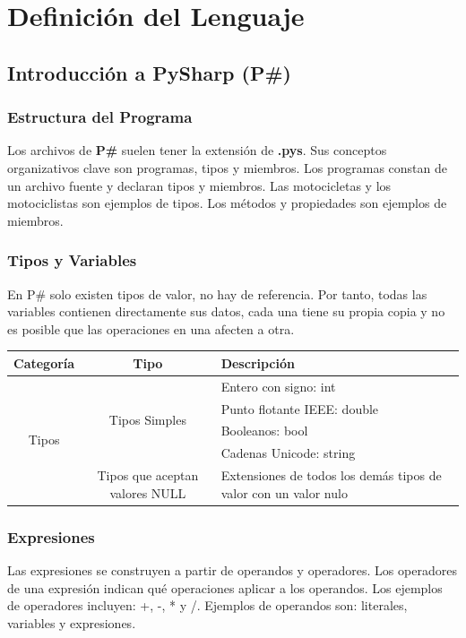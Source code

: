 \documentclass[12pt, letterpaper,spanish]{article}
\theoremstyle{definition}
\theoremstyle{remark}
\begin{document}
\newpage

\section{Definición del Lenguaje {\footnotesize \cite{conferenciasC}\cite{ullman}}}
	\subsection{Introducción a PySharp (P\#)}

		\subsubsection{Estructura del Programa}
		Los archivos de \textbf{P\#} suelen tener la extensión de \textbf{.pys}. Sus conceptos organizativos clave son programas, tipos y miembros. Los programas constan de un archivo fuente y declaran tipos y miembros. Las motocicletas y los motociclistas son ejemplos de tipos. Los métodos y propiedades son ejemplos de miembros.
	
	\subsubsection{Tipos y Variables}
	En P\# solo existen tipos de valor, no hay de referencia. Por tanto, todas las variables contienen directamente sus datos, cada una tiene su propia copia y no es posible que las operaciones en una afecten a otra.

	\begin{center}
		\begin{tabular}{| c | c | m{5cm} | }
			\hline
			Categoría & Tipo & Descripción \\ \hline
			\multirow{5}{*}{Tipos} & \multirow{4}{*}{Tipos Simples} & Entero con signo: int \\ \cline{3-3}
			&  & Punto flotante IEEE: double \\ \cline{3-3}
			&  & Booleanos: bool \\ \cline{3-3}
			&  & Cadenas Unicode: string \\ \cline{2-3}
			& Tipos que aceptan valores NULL & Extensiones de todos los demás tipos de valor con un valor nulo \\ \hline
		\end{tabular}
	\end{center}

	\subsubsection{Expresiones}
	Las expresiones se construyen a partir de operandos y operadores. Los operadores de una expresión indican qué operaciones aplicar a los operandos. Los ejemplos de operadores incluyen: +, -, * y /. Ejemplos de operandos son: literales, variables y expresiones.
\end{document}
